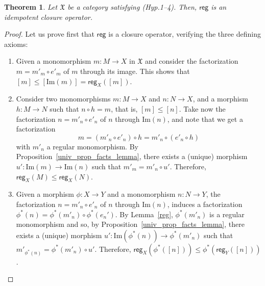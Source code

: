 \documentclass[12pt]{article}
\newtheorem{theorem}[lemma]{Theorem}
\theoremstyle{definition}
\def\X{\mathfrak X}
\def\Im{\mathrm{Im}}
\numberwithin{equation}{section}
\newcommand{\im}[1]{\mathrm{Im}(#1)}
\def\reg{\mathsf{reg}}
\begin{document}
\begin{theorem}\label{thm_reg} 
Let $\X$ be a category satisfying (Hyp.1--4). Then, $\mathsf{reg}$ is an idempotent closure operator.
\end{theorem}
\begin{proof}
Let us prove first that $\reg$ is a closure operator, verifying the three defining axioms:
\begin{enumerate}[\rm {(CO.}1)]
\item Given a monomorphism $m\colon M\to X$ in $\X$ and consider the factorization $m=m'_m\circ e'_m$ of $m$ through its image. This shows that $[m]\leq [\Im(m)]=\reg_X([m])$.
\item Consider two monomorphisms $m\colon M\to X$ and $n\colon N\to X$, and a morphism $h\colon M\to N$ such that $n\circ h=m$, that is, $[m]\leq [n]$. Take now the factorization $n=m'_n\circ e'_n$ of $n$ through $\Im(n)$, and note that we get a factorization \[m=(m'_n\circ e'_n)\circ h=m'_n\circ (e'_n\circ h)\] with $m'_n$ a regular monomorphism. By Proposition~\ref{univ_prop_facts_lemma}, there exists a (unique) morphism $u'\colon \Im(m)\to \Im(n)$ such that $m'_m=m'_n\circ u'$. Therefore, $\reg_X(M)\leq \reg_X(N)$.
\item Given a morphism $\phi\colon X\rightarrow Y$ and a monomorphism $n\colon N\rightarrow Y$, the factorization $n=m'_n\circ e'_n$ of $n$ through $\Im(n)$, induces a factorization $\phi^*(n)=\phi^*(m'_n)\circ \phi^*(e_n')$.
 By Lemma~\ref{reg}, $\phi^*(m'_n)$ is a regular monomorphism and so, by Proposition~\ref{univ_prop_facts_lemma}, there exists a (unique) morphism $u'\colon \Im(\phi^*(n))\to \phi^*(m'_n)$ such that $m'_{\phi^*(n)}=\phi^*(m'_n)\circ u'$. Therefore, $\reg_X(\phi^*([n]))\leq \phi^*(\reg_Y([n]))$.
%

\end{enumerate}
\end{proof}
\end{document}
